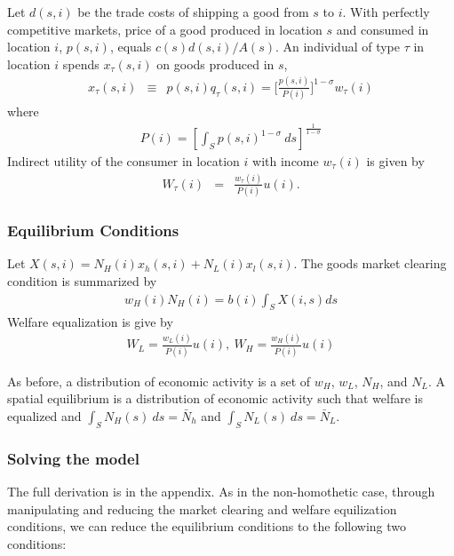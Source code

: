 \documentclass{article}
\begin{document}
Let $d(s,i)$ be the trade costs of shipping a good from $s$ to $i$. With perfectly competitive markets, price of a good produced in location $s$ and consumed in location $i$, $p(s,i)$, equals $c(s)d(s,i)/A(s)$. An individual of type $\tau$ in location $i$ spends $x_\tau(s,i)$ on goods produced in $s$,
\begin{eqnarray}
    \label{eq:homo_demand}
	x_\tau(s,i) & \equiv & p(s,i) q_\tau(s,i) = \Big[ \frac{p(s,i)}{P(i)} \Big]^{1-\sigma} w_\tau(i) 
\end{eqnarray}
where 
\begin{eqnarray}
    \label{eq:homo_price_index}
	P(i) = \left[\int_S p(s,i)^{1-\sigma}~ ds\right]^{\frac{1}{1-\sigma}} \nonumber
\end{eqnarray}
Indirect utility of the consumer in location $i$ with income $w_\tau(i)$ is given by
\begin{eqnarray}
	W_\tau(i) & = & \frac{w_\tau(i)}{P(i)}u(i). \nonumber
\end{eqnarray}

\subsubsection{Equilibrium Conditions}
Let $X(s,i)= N_H(i)x_h(s,i) + N_L(i)x_l(s,i)$.  The goods market clearing condition is summarized by
\begin{eqnarray}
    \label{eq:homo_mcc}
	w_H(i) N_H(i) =  b(i) \int_S X(i,s) ds 
\end{eqnarray}
Welfare equalization is give by
\begin{eqnarray}
	W_L = \frac{w_L(i)}{P(i)}u(i) , ~ 	 \nonumber
    \label{eq:homo_wel_eq}
	W_H = \frac{w_H(i)}{P(i)}u(i) 
\end{eqnarray}

As before, a distribution of economic activity is a set of $w_H$, $w_L$, $N_H$, and $N_L$. A spatial equilibrium is a distribution of economic activity such that welfare is equalized and $\int_S N_H(s) ~ds = \bar{N}_h$ and $\int_S N_L(s) ~ds = \bar{N}_L$.

\subsubsection{Solving the model}

The full derivation is in the appendix.  As in the non-homothetic case, through manipulating and reducing the market clearing and welfare equilization conditions, we can reduce the equilibrium conditions to the following two conditions:
\end{document}
